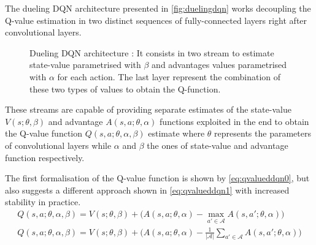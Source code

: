 The dueling DQN architecture \cite{wang2015dueling} presented in \vref{fig:duelingdqn} works decoupling the Q-value estimation in two distinct sequences of fully-connected layers right after convolutional layers.
\begin{figure}
	\centering
	\caption[Dueling DQN]{\small Dueling DQN architecture \cite{wang2015dueling}: It consists in two stream to estimate state-value parametrised with $\beta$ and advantages values parametrised with $\alpha$ for each action. The last layer represent the combination of these two types of values to obtain the Q-function. \cite{franccois2018introduction}}
	\label{fig:duelingdqn}
\end{figure}

These streams are capable of providing separate estimates of the state-value  $V(s; \theta, \beta)$ and advantage $A(s,a; \theta, \alpha)$ functions exploited in the end to obtain the Q-value function $Q(s,a; \theta, \alpha, \beta)$ estimate where $\theta$ represents the parameters of convolutional layers while $\alpha$ and $\beta$ the ones of state-value and advantage function respectively.

The first formalisation of the Q-value function is shown by \vref{eq:qvalueddqn0}, but \cite{wang2015dueling} also suggests a different approach shown in \vref{eq:qvalueddqn1} with increased stability in practice.
\begin{gather} 
Q(s,a; \theta, \alpha, \beta) = V(s;\theta, \beta) + \big(A(s,a;\theta, \alpha) - \max_{a' \in \mathcal{A}}A(s, a'; \theta, \alpha)\big) \label{eq:qvalueddqn0}\\
Q(s,a; \theta, \alpha, \beta) = V(s;\theta, \beta) + \big(A(s,a;\theta, \alpha) - \frac{1}{|\mathcal{A}|}\sum_{a' \in \mathcal{A}}A(s, a'; \theta, \alpha)\big) \label{eq:qvalueddqn1}
\end{gather}



